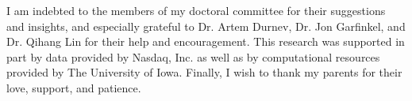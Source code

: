 I am indebted to the members of my doctoral committee for their suggestions and insights, and especially grateful to Dr. Artem Durnev, Dr. Jon Garfinkel, and Dr. Qihang Lin for their help and encouragement. This research was supported in part by data provided by Nasdaq, Inc. as well as by computational resources provided by The University of Iowa. Finally, I wish to thank my parents for their love, support, and patience.
